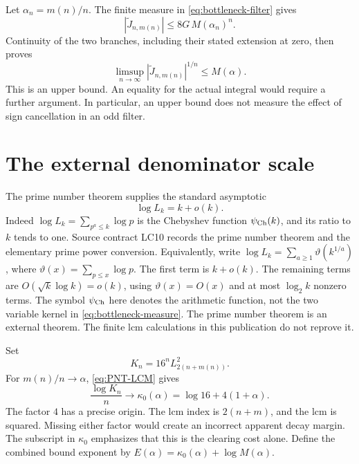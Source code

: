 Let $\alpha_n=m(n)/n$. The finite measure in \eqref{eq:bottleneck-filter} gives
\begin{equation}
 |\widetilde J_{n,m(n)}|
 \leq 8G\,M(\alpha_n)^n.
 \label{eq:actual-M-bound}
\end{equation}
Continuity of the two branches, including their stated extension at zero, then proves
\begin{equation}
 \limsup_{n\to\infty}
 |\widetilde J_{n,m(n)}|^{1/n}\leq M(\alpha).
 \label{eq:M-limsup}
\end{equation}
This is an upper bound. An equality for the actual integral would require a further argument. In particular, an upper bound does not measure the effect of sign cancellation in an odd filter.

\section{The external denominator scale}

The prime number theorem supplies the standard asymptotic~\cite{Zagier1997}
\begin{equation}
 \log L_k=k+o(k).
 \label{eq:PNT-LCM}
\end{equation}
Indeed $\log L_k=\sum_{p^a\leq k}\log p$ is the Chebyshev function $\psi_{\rm Ch}(k)$, and its ratio to $k$ tends to one. Source contract LC10 records the prime number theorem and the elementary prime power conversion. Equivalently, write $\log L_k=\sum_{a\geq1}\vartheta(k^{1/a})$, where $\vartheta(x)=\sum_{p\leq x}\log p$. The first term is $k+o(k)$. The remaining terms are $O(\sqrt{k}\log k)=o(k)$, using $\vartheta(x)=O(x)$ and at most $\log_2 k$ nonzero terms. The symbol $\psi_{\rm Ch}$ here denotes the arithmetic function, not the two variable kernel in \eqref{eq:bottleneck-measure}. The prime number theorem is an external theorem. The finite lcm calculations in this publication do not reprove it.

Set
\begin{equation}
 K_n=16^nL_{2(n+m(n))}^2.
 \label{eq:K-asymptotic}
\end{equation}
For $m(n)/n\to\alpha$, \eqref{eq:PNT-LCM} gives
\begin{equation}
 \frac{\log K_n}{n}\longrightarrow
 \kappa_0(\alpha)=\log16+4(1+\alpha).
 \label{eq:kappa-alpha}
\end{equation}
The factor $4$ has a precise origin. The lcm index is $2(n+m)$, and the lcm is squared. Missing either factor would create an incorrect apparent decay margin. The subscript in $\kappa_0$ emphasizes that this is the clearing cost alone. Define the combined bound exponent by $E(\alpha)=\kappa_0(\alpha)+\log M(\alpha)$.


